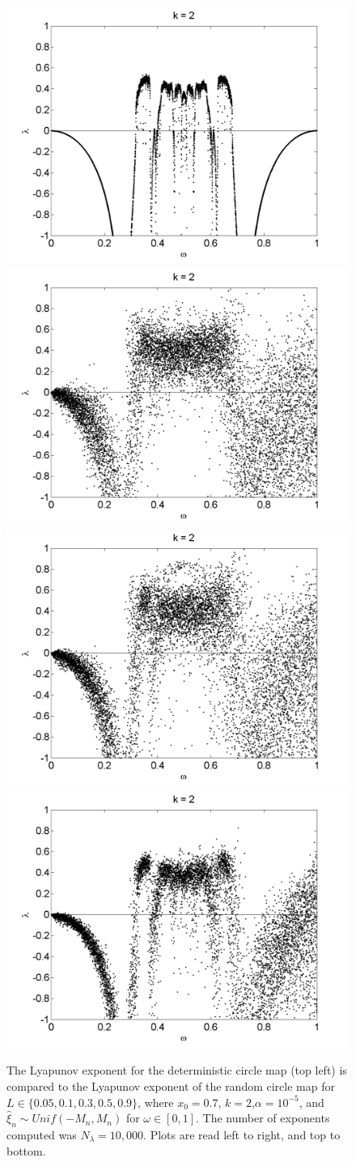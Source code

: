 \begin{figure}[!h]
\caption[Lyapunov exponent in the random circle map (uniform distribution) compared to the
deterministic map, varying $\omega$, $\alpha = 10^{-5}$]{The Lyapunov exponent for the deterministic
  circle map (top left) is compared
  to the Lyapunov exponent of the random circle map for $L \in
  \{0.05,0.1,0.3,0.5,0.9\}$, where $x_0=0.7$, $k=2$,$\alpha =
  10^{-5}$, and $\hat{\xi}_n\sim
  Unif(-M_n,M_n)$ for $\omega \in [0,1]$. The number of exponents computed was $N_\lambda=10,000$. Plots are read left to right, and top to bottom. }\label{fig:rcirclyap_u}
\centering
\includegraphics[width=.5\textwidth]{figs/detcirc_lyap_10000_k_2_w.png}\hfill
\includegraphics[width=.5\textwidth]{figs/rcirc_u_lyap_10000_L_005_k_2_w.png}\\
\includegraphics[width=.5\textwidth]{figs/rcirc_u_lyap_10000_L_01_k_2_w.png}\hfill
\includegraphics[width=.5\textwidth]{figs/rcirc_u_lyap_10000_L_03_k_2_w.png}\\

\end{figure}

